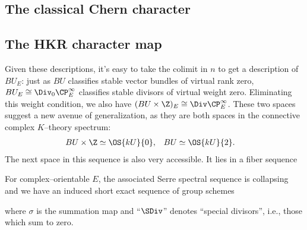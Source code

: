     \subsection*{The classical Chern character}
    \subsection*{The HKR character map}


\newpage




\oldsection*{$BU[2k, \infty)$}

Given these descriptions, it's easy to take the colimit in $n$ to get a description of $BU_E$: just as $BU$ classifies stable vector bundles of virtual rank zero, $BU_E \cong \Div_0 \CP^\infty_E$ classifies stable divisors of virtual weight zero.  Eliminating this weight condition, we also have $(BU \times \Z)_E \cong \Div \CP^\infty_E$.  These two spaces suggest a new avenue of generalization, as they are both spaces in the connective complex $K$--theory spectrum:
\begin{align*}
BU \times \Z & \simeq \OS{kU}{0}, & BU & \simeq \OS{kU}{2}.
\end{align*}
The next space in this sequence is also very accessible.  It lies in a fiber sequence
\begin{center}
\end{center}
For complex--orientable $E$, the associated Serre spectral sequence is collapsing and we have an induced short exact sequence of group schemes
\begin{center}
\end{center}
where $\sigma$ is the summation map and ``$\SDiv$'' denotes ``special divisors'', i.e., those which sum to zero.

